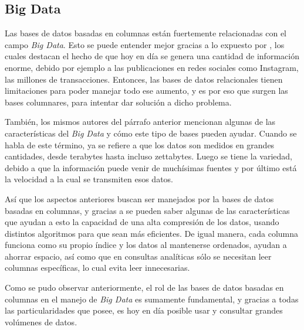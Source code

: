 \subsection{Big Data}
Las bases de datos basadas en columnas están fuertemente relacionadas con el campo  \textit{Big Data}. Esto se puede entender mejor gracias a lo expuesto por \textcite{saeed2020}, los cuales destacan el hecho de que hoy en día se genera una cantidad de información enorme, debido por ejemplo a las publicaciones en redes sociales como Instagram, las millones de transacciones. Entonces, las bases de datos relacionales tienen limitaciones para poder manejar todo ese aumento, y es por eso que surgen las bases columnares, para intentar dar solución a dicho problema.

	 También, los mismos autores del párrafo anterior mencionan algunas de las características del \textit{Big Data} y cómo este tipo de bases pueden ayudar. Cuando se habla de este término, ya se refiere a que los datos son medidos en grandes cantidades, desde terabytes hasta incluso zettabytes. Luego se tiene la variedad, debido a que la información puede venir de muchísimas fuentes y por último está la velocidad a la cual se transmiten esos datos.

	Así que los aspectos anteriores buscan ser manejados por la bases de datos basadas en columnas, y gracias a \textcite{saeed2020} se pueden saber algunas de las características que ayudan a esto la capacidad de una alta compresión de los datos, usando distintos algoritmos para que sean más eficientes. De igual manera, cada columna funciona como su propio índice y los datos al mantenerse ordenados, ayudan a ahorrar espacio, así como que en consultas analíticas sólo se necesitan leer columnas específicas, lo cual evita leer innecesarias.

Como se pudo observar anteriormente, el rol de las bases de datos basadas en columnas en el manejo de \textit{Big Data} es sumamente fundamental, y gracias a todas las particularidades que posee, es hoy en día posible usar y consultar grandes volúmenes de datos.